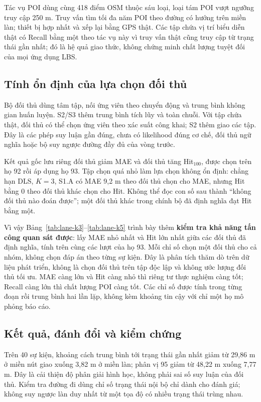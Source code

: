 Tác vụ POI dùng cùng 418 điểm OSM thuộc sáu loại, loại tám POI vượt ngưỡng truy cập 250 m. Truy vấn tìm tối đa năm POI theo đường có hướng trên miền làn; thiết bị hợp nhất và xếp lại bằng GPS thật. Các tập chứa vị trí biểu diễn thật có Recall bằng một theo tác vụ này vì truy vấn thật cũng truy cập từ trạng thái gần nhất; đó là hệ quả giao thức, không chứng minh chất lượng tuyệt đối của mọi ứng dụng LBS.

\subsection{Tính ổn định của lựa chọn đối thủ}

Bộ đối thủ dùng tâm tập, nối ứng viên theo chuyển động và trung bình không gian huấn luyện. S2/S3 thêm trung bình tích lũy và toàn chuỗi. Với tập chứa thật, đối thủ có thể chọn ứng viên theo xác suất công khai; S2 thêm giao các tập. Đây là các phép suy luận gần đúng, chưa có likelihood đúng cơ chế, đối thủ ngữ nghĩa hoặc bộ suy ngược đường đầy đủ của vòng trước.

Kết quả gốc lưu riêng đối thủ giảm MAE và đối thủ tăng Hit$_{100}$, được chọn trên họ 92 rồi áp dụng họ 93. Tập chọn quá nhỏ làm lựa chọn không ổn định: chẳng hạn DLS, $K=3$, S1.A có MAE 9,2 m theo đối thủ chọn cho MAE, nhưng Hit bằng 0 theo đối thủ khác chọn cho Hit. Không thể đọc con số sau thành ``không đối thủ nào đoán được''; một đối thủ khác trong chính bộ đã định nghĩa đạt Hit bằng một.

Vì vậy Bảng~\ref{tab:lane-k3}--\ref{tab:lane-k5} trình bày thêm \textbf{kiểm tra khả năng tấn công quan sát được}: lấy MAE nhỏ nhất và Hit lớn nhất giữa các đối thủ đã định nghĩa, tính trên cùng các lượt của họ 93. Mỗi chỉ số chọn một đối thủ cho cả nhóm, không chọn đáp án theo từng sự kiện. Đây là phân tích thăm dò trên dữ liệu phát triển, không là chọn đối thủ trên tập độc lập và không ước lượng đối thủ tối ưu. MAE càng lớn và Hit càng nhỏ thì riêng tư thực nghiệm càng tốt; Recall càng lớn thì chất lượng POI càng tốt. Các chỉ số được tính trong từng đoạn rồi trung bình hai lần lặp, không kèm khoảng tin cậy với chỉ một họ mô phỏng báo cáo.



\subsection{Kết quả, đánh đổi và kiểm chứng}

Trên 40 sự kiện, khoảng cách trung bình tới trạng thái gần nhất giảm từ 29,86 m ở miền nút giao xuống 3,82 m ở miền làn; phân vị 95 giảm từ 48,22 m xuống 7,77 m. Đây là cải thiện độ phân giải hình học, không phải sai số suy luận của đối thủ. Kiểm tra đường đi dùng chỉ số trạng thái nội bộ chỉ dành cho đánh giá; không suy ngược làn duy nhất từ một tọa độ có nhiều trạng thái trùng nhau.

